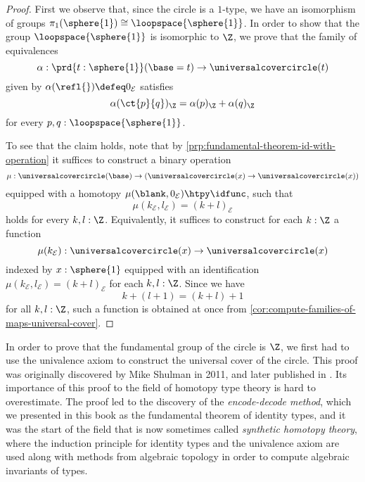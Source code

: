 \begin{proof}
  First we observe that, since the circle is a $1$-type, we have an isomorphism of groups $\pi_1(\sphere{1})\cong\loopspace{\sphere{1}}$. In order to show that the group $\loopspace{\sphere{1}}$ is isomorphic to $\Z$, we prove that the family of equivalences
  \begin{equation*}
    \alpha:\prd{t:\sphere{1}} (\base=t)\to \universalcovercircle(t)
  \end{equation*}
  given by $\alpha(\refl{})\defeq 0_{\mathcal{E}}$ satisfies
  \begin{equation*}
    \alpha(\ct{p}{q})_\Z=\alpha(p)_\Z+\alpha(q)_\Z
  \end{equation*}
  for every $p,q:\loopspace{\sphere{1}}$.
  
  To see that the claim holds, note that by \cref{prp:fundamental-theorem-id-with-operation} it suffices to construct a binary operation
  \begin{equation*}
    \mu : \universalcovercircle(\base)\to(\universalcovercircle(x)\to\universalcovercircle(x))
  \end{equation*}
  equipped with a homotopy $\mu(\blank,0_{\mathcal{E}})\htpy\idfunc$, such that
  \begin{equation*}
    \mu(k_{\mathcal{E}},l_{\mathcal{E}})=(k+l)_{\mathcal{E}}
  \end{equation*}
  holds for every $k,l:\Z$. Equivalently, it suffices to construct for each $k:\Z$ a function
  \begin{equation*}
    \mu(k_{\mathcal{E}}):\universalcovercircle(x)\to\universalcovercircle(x)
  \end{equation*}
  indexed by $x:\sphere{1}$ equipped with an identification $\mu(k_{\mathcal{E}},l_{\mathcal{E}})=(k+l)_{\mathcal{E}}$ for each $k,l:\Z$. Since we have
  \begin{equation*}
    k+(l+1)=(k+l)+1
  \end{equation*}
  for all $k,l:\Z$, such a function is obtained at once from \cref{cor:compute-families-of-maps-universal-cover}.
\end{proof}

In order to prove that the fundamental group of the circle is $\Z$, we first had to use the univalence axiom to construct the universal cover of the circle. This proof was originally discovered by Mike Shulman in 2011, and later published in \cite{LicataShulman}. Its importance of this proof to the field of homotopy type theory is hard to overestimate. The proof led to the discovery of the \emph{encode-decode method}, which we presented in this book as the fundamental theorem of identity types, and it was the start of the field that is now sometimes called \emph{synthetic homotopy theory}, where the induction principle for identity types and the univalence axiom are used along with methods from algebraic topology in order to compute algebraic invariants of types.

